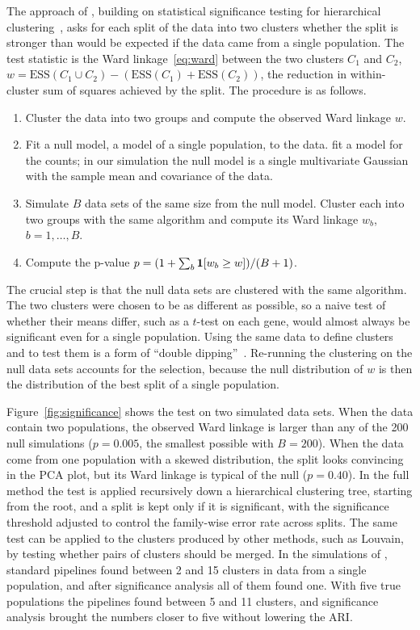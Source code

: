 The approach of \citet{grabski2023}, building on statistical significance testing for hierarchical clustering~\citep{kimes2017}, asks for each split of the data into two clusters whether the split is stronger than would be expected if the data came from a single population. The test statistic is the Ward linkage~\eqref{eq:ward} between the two clusters $C_1$ and $C_2$, $w=\text{ESS}(C_1\cup C_2)-\left(\text{ESS}(C_1)+\text{ESS}(C_2)\right)$, the reduction in within-cluster sum of squares achieved by the split. The procedure is as follows.
\begin{enumerate}
  \item Cluster the data into two groups and compute the observed Ward linkage $w$.
  \item Fit a null model, a model of a single population, to the data. \citet{grabski2023} fit a model for the counts; in our simulation the null model is a single multivariate Gaussian with the sample mean and covariance of the data.
  \item Simulate $B$ data sets of the same size from the null model. Cluster each into two groups with the same algorithm and compute its Ward linkage $w_b$, $b=1,\dots,B$.
  \item Compute the p-value $p=(1+\sum_b\mathbf{1}[w_b\geq w])/(B+1)$.
\end{enumerate}
The crucial step is that the null data sets are clustered with the same algorithm. The two clusters were chosen to be as different as possible, so a naive test of whether their means differ, such as a $t$-test on each gene, would almost always be significant even for a single population. Using the same data to define clusters and to test them is a form of ``double dipping''~\citep{gao2024}. Re-running the clustering on the null data sets accounts for the selection, because the null distribution of $w$ is then the distribution of the best split of a single population.

Figure~\ref{fig:significance} shows the test on two simulated data sets. When the data contain two populations, the observed Ward linkage is larger than any of the 200 null simulations ($p=0.005$, the smallest possible with $B=200$). When the data come from one population with a skewed distribution, the split looks convincing in the PCA plot, but its Ward linkage is typical of the null ($p=0.40$). In the full method the test is applied recursively down a hierarchical clustering tree, starting from the root, and a split is kept only if it is significant, with the significance threshold adjusted to control the family-wise error rate across splits. The same test can be applied to the clusters produced by other methods, such as Louvain, by testing whether pairs of clusters should be merged. In the simulations of \citet{grabski2023}, standard pipelines found between 2 and 15 clusters in data from a single population, and after significance analysis all of them found one. With five true populations the pipelines found between 5 and 11 clusters, and significance analysis brought the numbers closer to five without lowering the ARI.

